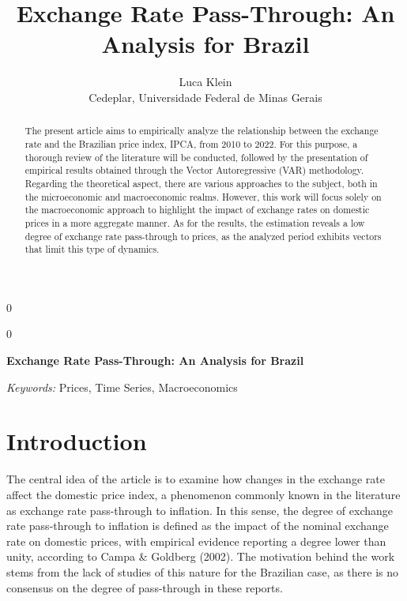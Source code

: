 \documentclass[12pt]{article}
\newcommand{\blind}{0}
\begin{document}
\def\spacingset#1{\renewcommand{\baselinestretch}%
{#1}\small\normalsize} \spacingset{1}



\blind
{
  \title{\bf Exchange Rate Pass-Through: An Analysis for Brazil}

  \author{
        Luca Klein \\
    Cedeplar, Universidade Federal de Minas Gerais\\
      }
  \maketitle
} \fi

\blind
{
  \bigskip
  \bigskip
  \bigskip
  \begin{center}
    {\LARGE\bf Exchange Rate Pass-Through: An Analysis for Brazil}
  \end{center}
  \medskip
} \fi

\bigskip
\begin{abstract}
The present article aims to empirically analyze the relationship between
the exchange rate and the Brazilian price index, IPCA, from 2010 to
2022. For this purpose, a thorough review of the literature will be
conducted, followed by the presentation of empirical results obtained
through the Vector Autoregressive (VAR) methodology. Regarding the
theoretical aspect, there are various approaches to the subject, both in
the microeconomic and macroeconomic realms. However, this work will
focus solely on the macroeconomic approach to highlight the impact of
exchange rates on domestic prices in a more aggregate manner. As for the
results, the estimation reveals a low degree of exchange rate
pass-through to prices, as the analyzed period exhibits vectors that
limit this type of dynamics.
\end{abstract}

\noindent%
{\it Keywords:} Prices, Time Series, Macroeconomics
\vfill

\newpage
\spacingset{1.45} %

\hypertarget{introduction}{%
\section{Introduction}\label{introduction}}

The central idea of the article is to examine how changes in the
exchange rate affect the domestic price index, a phenomenon commonly
known in the literature as exchange rate pass-through to inflation. In
this sense, the degree of exchange rate pass-through to inflation is
defined as the impact of the nominal exchange rate on domestic prices,
with empirical evidence reporting a degree lower than unity, according
to Campa \& Goldberg (2002). The motivation behind the work stems from
the lack of studies of this nature for the Brazilian case, as there is
no consensus on the degree of pass-through in these reports.
\end{document}
